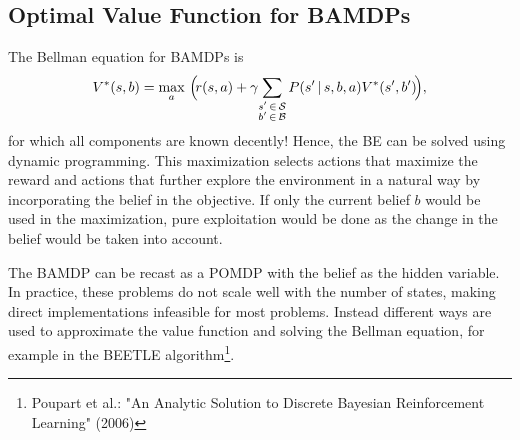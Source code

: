 
		\subsection{Optimal Value Function for BAMDPs}
			The Bellman equation for BAMDPs is
			\begin{equation*}
				V^\ast(s, b) = \max_a\, \Big(\! r(s, a) + \gamma \!\sum_{\substack{s' \,\in\, \mathcal{S} \\ b' \,\in\, \mathcal{B}}} P(s' \,\vert\, s, b, a) V^\ast(s', b') \!\Big),
			\end{equation*}
			for which all components are known decently! Hence, the BE can be solved using dynamic programming. This maximization selects actions that maximize the reward and actions that further explore the environment in a natural way by incorporating the belief in the objective. If only the current belief \(b\) would be used in the maximization, pure exploitation would be done as the change in the belief would be taken into account.

			The BAMDP can be recast as a POMDP with the belief as the hidden variable. In practice, these problems do not scale well with the number of states, making direct implementations infeasible for most problems. Instead different ways are used to approximate the value function and solving the Bellman equation, for example in the BEETLE algorithm\footnote{Poupart et al.: "An Analytic Solution to Discrete Bayesian Reinforcement Learning" (2006)}.

